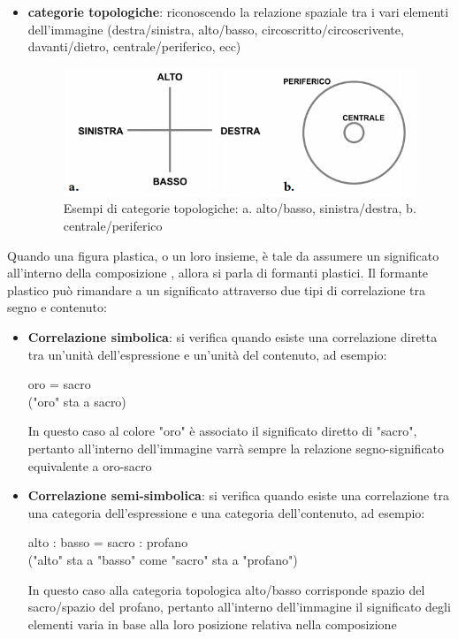 \documentclass[11pt,a4paper]{article}
\begin{document}
\begin{itemize}
	\item \textbf{categorie topologiche}: riconoscendo la relazione spaziale tra i vari elementi dell'immagine (destra/sinistra, alto/basso, circoscritto/circoscrivente, davanti/dietro, centrale/periferico, ecc)
		\begin{figure}
			\begin{center}
				\includegraphics[scale=0.6]{img/012.png}
			\end{center}	
			\caption{Esempi di categorie topologiche: a. alto/basso, sinistra/destra, b. centrale/periferico}
		\end{figure}
\end{itemize}
Quando una figura plastica, o un loro insieme, è tale da assumere un significato all'interno della composizione , allora si parla di formanti plastici. Il formante plastico può rimandare a un significato attraverso due tipi di correlazione tra segno e contenuto:
\begin{itemize}
	\item \textbf{Correlazione simbolica}: si verifica quando esiste una correlazione diretta tra un'unità dell'espressione e un'unità del contenuto, ad esempio:
		\begin{center}
			oro = sacro \\
			("oro" sta a sacro)
		\end{center}
		In questo caso al colore "oro" è associato il significato diretto di "sacro", pertanto all'interno dell'immagine varrà sempre la relazione segno-significato equivalente a oro-sacro
	\item \textbf{Correlazione semi-simbolica}: si verifica quando esiste una correlazione tra una categoria dell'espressione e una categoria dell'contenuto, ad esempio:
		\begin{center}
			alto : basso = sacro : profano\\
			("alto" sta a "basso" come "sacro" sta a "profano")
		\end{center}
	In questo caso alla categoria topologica alto/basso corrisponde spazio del sacro/spazio del profano, pertanto all'interno dell'immagine il significato degli elementi varia in base alla loro posizione relativa nella composizione
\end{itemize}
\end{document}
